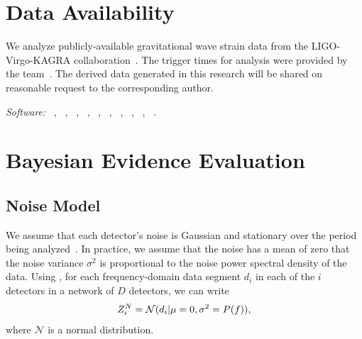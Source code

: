 \documentclass[useAMS,fleqn, usenatbib, final]{mnras}
\begin{document}
\section*{Data Availability}
{
We analyze publicly-available gravitational wave strain data from the LIGO-Virgo-KAGRA collaboration~\citep{dataO2}. The trigger times for analysis were provided by the \pycbc team~\citep{pycbc_ogc_2}. The derived data generated in this research will be shared on reasonable request to the corresponding author.
\begin{flushleft}
\textit{Software:} \href{https://lscsoft.docs.ligo.org/bilby/}{\bilby}~\citep[v0.6.8]{bilby}, \href{https://lscsoft.docs.ligo.org/bilby_pipe/master/index.html}{\bilbypipe}~\citep[v0.3.12]{bilby_pipe}, \href{https://dynesty.readthedocs.io/}{\dynesty}~\citep[v0.9.5.3]{dynesty}, \href{https://gwpy.github.io/docs/stable/index.html}{\gwpy}~\citep[v1.0.1]{gwpy}, \href{https://lscsoft.docs.ligo.org/lalsuite/lalsimulation/index.html}{}~\citep[v6.70]{lalsuite}, ~\citep[v3.2.0]{matplotlib}, ~\citep[v1.8.1]{NumPy}, ~\citep[v1.4.1]{SciPy}, ~\citep[v1.0.2]{pandas}, ~\citep[v3.7]{pythonForScientificComputing,pythonForScientists}. 
\end{flushleft}
}








\appendix



\section{Bayesian Evidence Evaluation}\label{sec:bayesianEvidEval}

\subsection{Noise Model}
We assume that each detector's noise is Gaussian and stationary over the period being analyzed~\citep{ligo_psd}. In practice, we assume that the noise has a mean of zero that the noise variance $\sigma^2$ is proportional to the noise power spectral density \psd of the data. Using \psd, for each frequency-domain data segment $d_i$ in each of the $i$ detectors in a network of $D$ detectors, we can write 
\begin{equation}
\label{eq:zn}
Z^N_i = \mathcal{N}(d_i|\mu=0,\sigma^2=\psd),
\end{equation}
where $\mathcal{N}$ is a normal distribution. 
\end{document}
